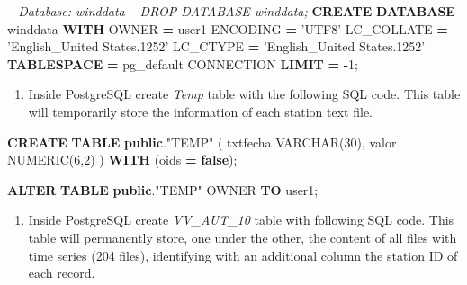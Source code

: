 \documentclass[12pt,oneside]{reedthesis}
\newenvironment{Shaded}{\begin{snugshade}}{\end{snugshade}}
\newcommand{\CommentTok}[1]{\textcolor[rgb]{0.56,0.35,0.01}{\textit{#1}}}
\newcommand{\DataTypeTok}[1]{\textcolor[rgb]{0.13,0.29,0.53}{#1}}
\newcommand{\DecValTok}[1]{\textcolor[rgb]{0.00,0.00,0.81}{#1}}
\newcommand{\KeywordTok}[1]{\textcolor[rgb]{0.13,0.29,0.53}{\textbf{#1}}}
\newcommand{\NormalTok}[1]{#1}
\newcommand{\OperatorTok}[1]{\textcolor[rgb]{0.81,0.36,0.00}{\textbf{#1}}}
\newcommand{\OtherTok}[1]{\textcolor[rgb]{0.56,0.35,0.01}{#1}}
\newcommand{\StringTok}[1]{\textcolor[rgb]{0.31,0.60,0.02}{#1}}
\providecommand{\tightlist}{%
  \setlength{\itemsep}{0pt}\setlength{\parskip}{0pt}}
\begin{document}
\scriptsize

\vspace{0.4cm}
\begin{Shaded}
\begin{Highlighting}[]
        \CommentTok{-- Database: winddata}
        \CommentTok{-- DROP DATABASE winddata;}
        \KeywordTok{CREATE} \KeywordTok{DATABASE}\NormalTok{ winddata}
            \KeywordTok{WITH} 
\NormalTok{            OWNER }\OperatorTok{=}\NormalTok{ user1}
\NormalTok{            ENCODING }\OperatorTok{=} \StringTok{'UTF8'}
\NormalTok{            LC_COLLATE }\OperatorTok{=} \StringTok{'English_United States.1252'}
\NormalTok{            LC_CTYPE }\OperatorTok{=} \StringTok{'English_United States.1252'}
            \KeywordTok{TABLESPACE} \OperatorTok{=}\NormalTok{ pg_default}
\NormalTok{            CONNECTION }\KeywordTok{LIMIT} \OperatorTok{=} \OperatorTok{-}\DecValTok{1}\NormalTok{;}
\end{Highlighting}
\end{Shaded}
\normalsize
\begin{enumerate}
\def\labelenumi{\arabic{enumi}.}
\setcounter{enumi}{2}
\tightlist
\item
  Inside PostgreSQL create \emph{Temp} table with the following SQL code. This table will temporarily store the information of each station text file.
\end{enumerate}
\scriptsize

\vspace{0.4cm}
\begin{Shaded}
\begin{Highlighting}[]
        \KeywordTok{CREATE} \KeywordTok{TABLE} \KeywordTok{public}\NormalTok{.}\OtherTok{"TEMP"}\NormalTok{ (}
\NormalTok{          txtfecha }\DataTypeTok{VARCHAR}\NormalTok{(}\DecValTok{30}\NormalTok{),}
\NormalTok{          valor }\DataTypeTok{NUMERIC}\NormalTok{(}\DecValTok{6}\NormalTok{,}\DecValTok{2}\NormalTok{) ) }\KeywordTok{WITH}\NormalTok{ (oids }\OperatorTok{=} \KeywordTok{false}\NormalTok{);}
        
        \KeywordTok{ALTER} \KeywordTok{TABLE} \KeywordTok{public}\NormalTok{.}\OtherTok{"TEMP"}
\NormalTok{          OWNER }\KeywordTok{TO}\NormalTok{ user1;}
\end{Highlighting}
\end{Shaded}
\normalsize
\begin{enumerate}
\def\labelenumi{\arabic{enumi}.}
\setcounter{enumi}{3}
\tightlist
\item
  Inside PostgreSQL create \emph{VV\_AUT\_10} table with following SQL code. This table will permanently store, one under the other, the content of all files with time series (204 files), identifying with an additional column the station ID of each record.
\end{enumerate}
\scriptsize
\end{document}
